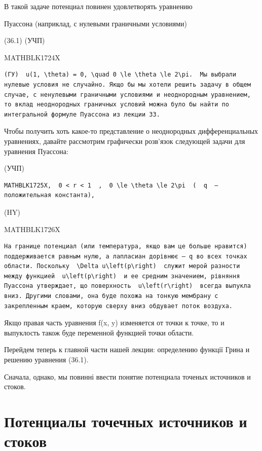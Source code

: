 \documentclass[
  ukrainian,
]{article}
\begin{document}
В такой задаче потенциал повинен удовлетворять уравнению

Пуассона (наприклад, с нулевыми граничными условиями)

(36.1) (УЧП)

MATHBLK1724X

\begin{verbatim}
(ГУ)  u(1, \theta) = 0, \quad 0 \le \theta \le 2\pi.  Мы выбрали нулевые условия не случайно. Якщо бы мы хотели решить задачу в общем случае, с ненулевыми граничными условиями и неоднородным уравнением, то вклад неоднородных граничных условий можна було бы найти по интегральной формуле Пуассона из лекции 33.
\end{verbatim}

Чтобы получить хоть какое-то представление о неоднородных
дифференциальных уравнениях, давайте рассмотрим графически розв'язок
следующей задачи для уравнения Пуассона:

(УЧП)

\begin{verbatim}
MATHBLK1725X,  0 < r < 1  ,  0 \le \theta \le 2\pi  (  q  —положительная константа),
\end{verbatim}

(HY)

MATHBLK1726X

\begin{verbatim}
На границе потенциал (или температура, якщо вам це больше нравится) поддерживается равным нулю, а лапласиан дорівнює — q во всех точках области. Поскольку  \Delta u\left(p\right)  служит мерой разности между функцией  u\left(p\right)  и ее средним значением, рівняння Пуассона утверждает, що поверхность  u\left(r\right)  всегда выпукла вниз. Другими словами, она буде похожа на тонкую мембрану с закрепленным краем, которую сверху вниз обдувает поток воздуха.
\end{verbatim}

Якщо правая часть уравнения f(x, y) изменяется от точки к точке, то и
выпуклость також буде переменной функцией точки области.

Перейдем теперь к главной части нашей лекции: определению функції Грина
и решению уравнения (36.1).

Сначала, однако, мы повинні ввести понятие потенциала точеных источников
и стоков.

\section{Потенциалы точечных источников и
стоков}\label{ux43fux43eux442ux435ux43dux446ux438ux430ux43bux44b-ux442ux43eux447ux435ux447ux43dux44bux445-ux438ux441ux442ux43eux447ux43dux438ux43aux43eux432-ux438-ux441ux442ux43eux43aux43eux432}
\end{document}
